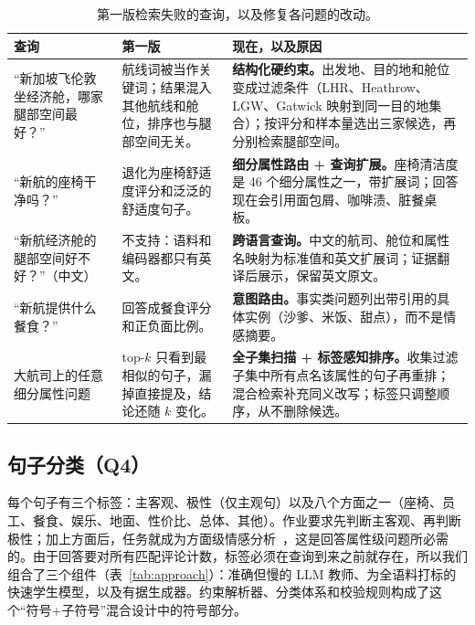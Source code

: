 \documentclass[10pt,twocolumn,a4paper]{article}
\begin{document}
\begin{table}[t]
\centering\small
\caption{第一版检索失败的查询，以及修复各问题的改动。}
\label{tab:fixes}
\begin{tabularx}{\textwidth}{@{}P{44mm}YY@{}}
\toprule
\textbf{查询} & \textbf{第一版} & \textbf{现在，以及原因} \\
\midrule
“新加坡飞伦敦坐经济舱，哪家腿部空间最好？” &
航线词被当作关键词；结果混入其他航线和舱位，排序也与腿部空间无关。 &
\textbf{结构化硬约束。}出发地、目的地和舱位变成过滤条件（LHR、Heathrow、LGW、Gatwick 映射到同一目的地集合）；按评分和样本量选出三家候选，再分别检索腿部空间。 \\
“新航的座椅干净吗？” &
退化为座椅舒适度评分和泛泛的舒适度句子。 &
\textbf{细分属性路由 + 查询扩展。}座椅清洁度是 46 个细分属性之一，带扩展词；回答现在会引用面包屑、咖啡渍、脏餐桌板。 \\
“新航经济舱的腿部空间好不好？”（中文） &
不支持：语料和编码器都只有英文。 &
\textbf{跨语言查询。}中文的航司、舱位和属性名映射为标准值和英文扩展词；证据翻译后展示，保留英文原文。 \\
“新航提供什么餐食？” &
回答成餐食评分和正负面比例。 &
\textbf{意图路由。}事实类问题列出带引用的具体实例（沙爹、米饭、甜点），而不是情感摘要。 \\
大航司上的任意细分属性问题 &
top-$k$ 只看到最相似的句子，漏掉直接提及，结论还随 $k$ 变化。 &
\textbf{全子集扫描 + 标签感知排序。}收集过滤子集中所有点名该属性的句子再重排；混合检索补充同义改写；标签只调整顺序，从不删除候选。 \\
\bottomrule
\end{tabularx}
\end{table}

\subsection{句子分类（Q4）}
\label{sec:cls}

每个句子有三个标签：主客观、极性（仅主观句）以及八个方面之一（座椅、员工、餐食、娱乐、地面、性价比、总体、其他）。作业要求先判断主客观、再判断极性；加上方面后，任务就成为方面级情感分析~\cite{pontiki2014}，这是回答属性级问题所必需的。由于回答要对所有匹配评论计数，标签必须在查询到来之前就存在，所以我们组合了三个组件（表~\ref{tab:approach}）：准确但慢的 LLM 教师、为全语料打标的快速学生模型，以及有据生成器。约束解析器、分类体系和校验规则构成了这个“符号+子符号”混合设计中的符号部分。
\end{document}
